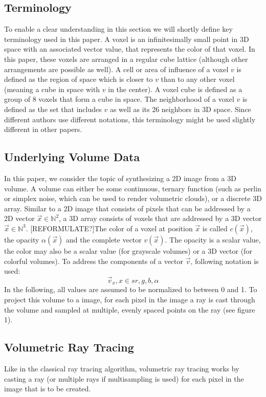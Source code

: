 \subsection{Terminology}
To enable a clear understanding in this section we will shortly define key terminology used in this paper. A voxel is an infinitesimally small point in 3D space with an associated vector value, that represents the color of that voxel. In this paper, these voxels are arranged in a regular cube lattice (although other arrangements are possible as well). A cell or area of influence of a voxel $v$ is defined as the region of space which is closer to $v$ than to any other voxel (meaning a cube in space with $v$ in the center). A voxel cube is defined as a group of 8 voxels that form a cube in space. The neighborhood of a voxel $v$ is defined as the set that includes $v$ as well as its 26 neighbors in 3D space. Since different authors use different notations, this terminology might be used slightly different in other papers.
\subsection{Underlying Volume Data}
In this paper, we consider the topic of synthesizing a 2D image from a 3D volume.
A volume can either be some continuous, ternary function (such as perlin or simplex noise\cite{10.1145/325165.325247}, which can be used to render volumetric clouds\cite{haggstrom2018real}), or a discrete 3D array\cite{511}.
Similar to a 2D image that consists of pixels that can be addressed by a 2D vector $\vec{x} \in \mathbb{N}^2$, a 3D array consists of voxels that are addressed by a 3D vector $\vec{x} \in \mathbb{N}^3$. [REFORMULATE?]The color of a voxel at position $\vec{x}$ is called $c(\vec{x})$, the opacity $\alpha(\vec{x})$ and the complete vector $v(\vec{x})$. The opacity is a scalar value, the color may also be a scalar value (for grayscale volumes) or a 3D vector (for colorful volumes).
To address the components of a vector $\vec{v}$, following notation is used:
\begin{equation}
	\vec{v}_{x}, x \in s{r, g, b, \alpha}
\end{equation}
 In the following, all values are assumed to be normalized to between 0 and 1. To project this volume to a image, for each pixel in the image a ray is cast through the volume and sampled at multiple, evenly spaced points on the ray (see figure 1)\cite{10.1145/78964.78965}.

\subsection{Volumetric Ray Tracing}
Like in the classical ray tracing algorithm, volumetric ray tracing works by casting a ray (or multiple rays if multisampling is used) for each pixel in the image that is to be created.

